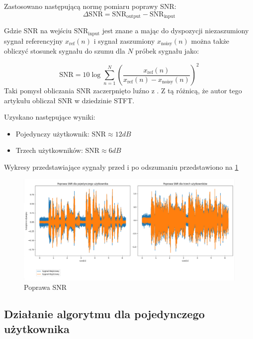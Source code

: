 \noindent Zastosowano następującą normę pomiaru poprawy SNR:
\begin{equation}
    \label{delta_SNR}
    \Delta \mathrm{SNR} = \mathrm{SNR}_{\mathrm{output}} - \mathrm{SNR}_{\mathrm{input}}
\end{equation}

\noindent Gdzie SNR na wejściu $\mathrm{SNR}_{\mathrm{input}}$ jest znane a mając do dyspozycji niezaszumiony sygnał referencyjny $x_{\mathrm{ref}}(n)$ i sygnał zaszumiony $x_{\mathrm{noisy}}(n)$ można także obliczyć stosunek sygnału do szumu dla $N$ próbek sygnału jako:

\begin{equation}
    \label{SNR}
    \mathrm{SNR} = 10 \log \sum_{n=1}^{N}\left(
    \dfrac
    {x_{\mathrm{ref}}(n)}
    {x_{\mathrm{ref}}(n)-x_{\mathrm{noisy}}(n)} \right)^{2}
\end{equation}
\noindent Taki pomysł obliczania SNR zaczerpnięto luźno z \cite{Virtanen2006}. Z tą różnicą, że autor tego artykułu obliczał SNR w dziedzinie STFT.

\noindent Uzyskano następujące wyniki:
\begin{itemize}
    \item Pojedynczy użytkownik: $\mathrm{SNR} \approx 12dB$ 
    \item Trzech użytkowników: $\mathrm{SNR} \approx 6dB$
\end{itemize}

\noindent Wykresy przedstawiające sygnały przed i po odszumaniu przedstawiono na \ref{fig:snr_boost}

\begin{figure}[H]
    \centering
    \includegraphics[width=\textwidth]{Images/snr_boost.png}
    \caption{Poprawa SNR}
    \label{fig:snr_boost}
\end{figure}

\subsection{Działanie algorytmu dla pojedynczego użytkownika}

